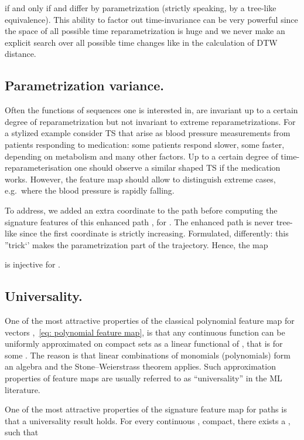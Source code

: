 \documentclass{article}
\begin{document}
 if and only if  and  differ by parametrization (strictly speaking, by a tree-like equivalence).
This ability to factor out time-invariance can be very powerful since the space of all possible time reparametrization is huge and we never make an explicit search over all possible time changes like in the calculation of DTW distance.

\subsection{Parametrization variance.}
Often the functions of sequences  one is interested in, are invariant up to a certain degree of reparametrization but not invariant to extreme reparametrizations.
For a stylized example consider TS that arise as blood pressure measurements from patients responding to medication: some patients respond slower, some faster, depending on metabolism and many other factors. 
Up to a certain degree of time-reparameterisation one should observe a similar shaped TS if the medication works. 
However, the feature map should allow to distinguish extreme cases, e.g.~where the blood pressure is rapidly falling.

To address, we added an extra coordinate to the path  before computing the signature features of this enhanced path , for .
The enhanced path  is never tree-like since the first coordinate  is strictly increasing.
Formulated, differently: this ''trick`' makes the parametrization part of the trajectory. 
Hence, the map

is injective for .


\subsection{Universality.} \label{app:univ}
One of the most attractive properties of the classical polynomial feature map  for vectors ,~\eqref{eq: polynomial feature map}, is that any continuous function  can be uniformly approximated on compact sets as a linear functional of , that is  for some .
The reason is that linear combinations of monomials (polynomials) form an algebra and the Stone--Weierstrass theorem applies.
Such approximation properties of feature maps are usually referred to as ``universality'' in the ML literature.

One of the most attractive properties of the signature feature map  for paths  is that a universality result holds. 
For every continuous ,  compact,  there exists a ,  such that  
 	
\end{document}
